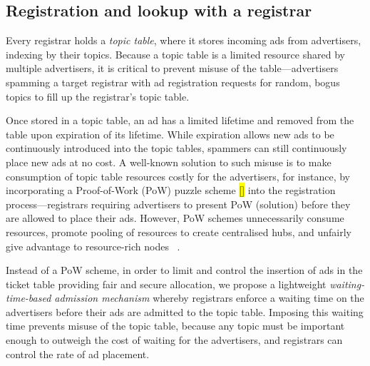 \subsection{Registration and lookup with a registrar}

Every registrar holds a \emph{topic table}, where it stores incoming ads from advertisers, indexing by their topics. Because a topic table is a limited resource shared by multiple advertisers, it is critical to prevent misuse of the table---\eg advertisers spamming a target registrar with ad registration requests for random, bogus topics to fill up the registrar's topic table. %

Once stored in a topic table, an ad has a limited lifetime and removed from the table upon expiration of its lifetime. While expiration allows new ads to be continuously introduced into the topic tables, spammers can still continuously place new ads at no cost. A well-known solution to such misuse is to make consumption of topic table resources costly for the advertisers, for instance, by incorporating a Proof-of-Work (PoW) puzzle scheme \hl{[]} into the registration process---\eg registrars requiring advertisers to present PoW (\ie solution) before they are allowed to place their ads. However, PoW schemes unnecessarily consume resources, promote pooling of resources to create centralised hubs, and unfairly give advantage to resource-rich nodes ~\cite{gervais2014bitcoin}. 




Instead of a PoW scheme, in order to limit and control the insertion of ads in the ticket table providing fair and secure allocation, we propose a lightweight \textit{waiting-time-based admission mechanism} whereby registrars enforce a waiting time on the advertisers before their ads are admitted to the topic table. Imposing this waiting time prevents misuse of the topic table, because any topic must be important enough to outweigh the cost of waiting for the advertisers, and registrars can control the rate of ad placement. 

